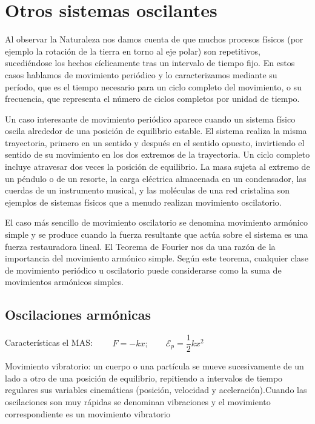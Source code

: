 \chapter{Otros sistemas oscilantes}

\vspace{-5mm}%
\begin{miparrafo}
	\small{Al observar la Naturaleza nos damos cuenta de que muchos procesos físicos (por ejemplo la rotación de la tierra en torno al eje polar) son repetitivos, sucediéndose los hechos cíclicamente tras un intervalo de tiempo fijo. En estos casos hablamos de movimiento periódico y lo caracterizamos mediante su período, que es el tiempo necesario para un ciclo completo del movimiento, o su frecuencia, que representa el número de ciclos completos por unidad de tiempo.}

\small{Un caso interesante de movimiento periódico aparece cuando un sistema físico oscila alrededor de una posición de equilibrio estable. El sistema realiza la misma trayectoria, primero en un sentido y después en el sentido opuesto, invirtiendo el sentido de su movimiento en los dos extremos de la trayectoria. Un ciclo completo incluye atravesar dos veces la posición de equilibrio. La masa sujeta al extremo de un péndulo o de un resorte, la carga eléctrica almacenada en un condensador, las cuerdas de un instrumento musical, y las moléculas de una red cristalina son ejemplos de sistemas físicos que a menudo realizan movimiento oscilatorio.}

\small{El caso más sencillo de movimiento oscilatorio se denomina movimiento armónico simple y se produce cuando la fuerza resultante que actúa sobre el sistema es una fuerza restauradora lineal. El Teorema de Fourier nos da una razón de la importancia del movimiento armónico simple. Según este teorema, cualquier clase de movimiento periódico u oscilatorio puede considerarse como la suma de movimientos armónicos simples}\normalsize{.}
\end{miparrafo}

\vspace{15mm} %
\section{Oscilaciones armónicas}

Características el MAS: $\qquad F=-kx;\qquad \mathcal E_p=\dfrac 1 2 k x^2$

Movimiento vibratorio: un cuerpo o una partícula se mueve sucesivamente de un lado a otro de una posición de equilibrio, repitiendo a intervalos de tiempo regulares sus variables cinemáticas (posición, velocidad y aceleración).Cuando las oscilaciones son muy rápidas se denominan vibraciones y el movimiento correspondiente es un movimiento vibratorio

